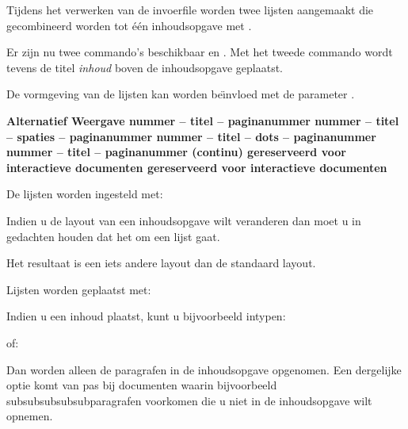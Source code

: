 Tijdens het verwerken van de invoerfile worden twee lijsten
aangemaakt die gecombineerd worden tot \'e\'en inhoudsopgave
met .

\startbuffer
{}
\stopbuffer

\typebuffer

Er zijn nu twee commando's beschikbaar \type{\plaatsinhoud}
en \type{\volledigeinhoud}. Met het tweede commando wordt
tevens de titel {\em inhoud} boven de inhoudsopgave geplaatst.

De vormgeving van de lijsten kan worden be\"{\i}nvloed met
de parameter .

\starttabel[|c|l|]
\HL
\NC \bf Alternatief \NC \bf Weergave \NC\SR
\HL
\NC {} \NC nummer -- titel -- paginanummer            \NC\FR
\NC {} \NC nummer -- titel -- spaties -- paginanummer \NC\MR
\NC {} \NC nummer -- titel -- dots -- paginanummer    \NC\MR
\NC {} \NC nummer -- titel -- paginanummer (continu)  \NC\MR
\NC {} \NC gereserveerd voor interactieve documenten  \NC\MR
\NC {} \NC gereserveerd voor interactieve documenten  \NC\LR
\HL
\stoptabel

De lijsten worden ingesteld met:


Indien u de layout van een inhoudsopgave wilt veranderen dan
moet u in gedachten houden dat het om een lijst gaat.

\startbuffer
\stelsamengesteldelijstin
  [inhoud]
  [variant=c,
   titeluitlijnen=nee,
   breedte=2.5cm]
\stopbuffer

\typebuffer

Het resultaat is een iets andere layout dan de standaard
layout.

Lijsten worden geplaatst met:


Indien u een inhoud plaatst, kunt u bijvoorbeeld intypen:

\starttypen
\plaatslijst[inhoud][niveau=paragraaf]
\stoptypen

of:

\starttypen
\plaatsinhoud[niveau=paragraaf]
\stoptypen

Dan worden alleen de paragrafen in de inhoudsopgave opgenomen.
Een dergelijke optie komt van pas bij documenten waarin
bijvoorbeeld subsubsubsubsubparagrafen voorkomen die u niet
in de inhoudsopgave wilt opnemen.

